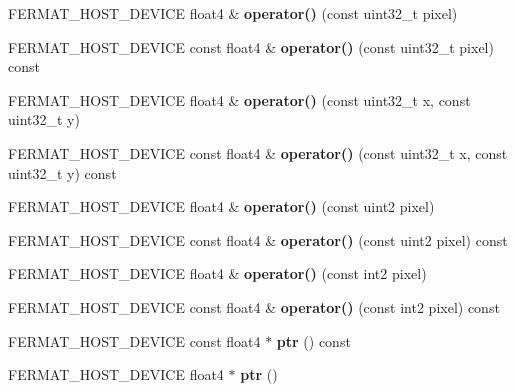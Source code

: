 \begin{DoxyCompactItemize}
\item 
\mbox{\label{struct_f_buffer_channel_view_a75852896b2d3c5a9f23903112a1f969f}} 
F\+E\+R\+M\+A\+T\+\_\+\+H\+O\+S\+T\+\_\+\+D\+E\+V\+I\+CE float4 \& {\bfseries operator()} (const uint32\+\_\+t pixel)
\item 
\mbox{\label{struct_f_buffer_channel_view_a3bb7bcc18eabf1a374a1ed0e551033e4}} 
F\+E\+R\+M\+A\+T\+\_\+\+H\+O\+S\+T\+\_\+\+D\+E\+V\+I\+CE const float4 \& {\bfseries operator()} (const uint32\+\_\+t pixel) const
\item 
\mbox{\label{struct_f_buffer_channel_view_ac98c591f7732d2ab8403a903ab2d4081}} 
F\+E\+R\+M\+A\+T\+\_\+\+H\+O\+S\+T\+\_\+\+D\+E\+V\+I\+CE float4 \& {\bfseries operator()} (const uint32\+\_\+t x, const uint32\+\_\+t y)
\item 
\mbox{\label{struct_f_buffer_channel_view_a48356e00b130fd214e0ae3eee581b352}} 
F\+E\+R\+M\+A\+T\+\_\+\+H\+O\+S\+T\+\_\+\+D\+E\+V\+I\+CE const float4 \& {\bfseries operator()} (const uint32\+\_\+t x, const uint32\+\_\+t y) const
\item 
\mbox{\label{struct_f_buffer_channel_view_a2a6b2520750c6d024d93fb1839a6b9ff}} 
F\+E\+R\+M\+A\+T\+\_\+\+H\+O\+S\+T\+\_\+\+D\+E\+V\+I\+CE float4 \& {\bfseries operator()} (const uint2 pixel)
\item 
\mbox{\label{struct_f_buffer_channel_view_aabf1b7b4320bee4ea3e5503b20395b22}} 
F\+E\+R\+M\+A\+T\+\_\+\+H\+O\+S\+T\+\_\+\+D\+E\+V\+I\+CE const float4 \& {\bfseries operator()} (const uint2 pixel) const
\item 
\mbox{\label{struct_f_buffer_channel_view_a8fb530e09e406d506ef56cbc70894e2e}} 
F\+E\+R\+M\+A\+T\+\_\+\+H\+O\+S\+T\+\_\+\+D\+E\+V\+I\+CE float4 \& {\bfseries operator()} (const int2 pixel)
\item 
\mbox{\label{struct_f_buffer_channel_view_a16f431b3c21b7cc2155dd410561f0a59}} 
F\+E\+R\+M\+A\+T\+\_\+\+H\+O\+S\+T\+\_\+\+D\+E\+V\+I\+CE const float4 \& {\bfseries operator()} (const int2 pixel) const
\item 
\mbox{\label{struct_f_buffer_channel_view_a1c1aeb9ff121928eaa7de61b9c79f137}} 
F\+E\+R\+M\+A\+T\+\_\+\+H\+O\+S\+T\+\_\+\+D\+E\+V\+I\+CE const float4 $\ast$ {\bfseries ptr} () const
\item 
\mbox{\label{struct_f_buffer_channel_view_a4b6441a11b931d336a1565f81306508f}} 
F\+E\+R\+M\+A\+T\+\_\+\+H\+O\+S\+T\+\_\+\+D\+E\+V\+I\+CE float4 $\ast$ {\bfseries ptr} ()
\end{DoxyCompactItemize}
